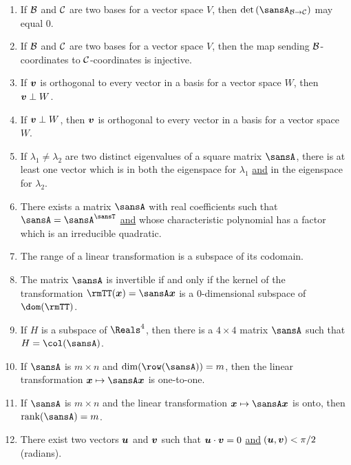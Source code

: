 \documentclass[12pt]{article}
\begin{document}
\begin{enumerate}[topsep=0.125in, itemsep=0.5in]
\begin{enumerate}[topsep=0.125in, itemsep=0.25in]
			\item If $\mathcal{B}$ and $\mathcal{C}$ are two bases for a vector space $V$, then $\det\left(\sansA_{\calB\to\calC}\right)$ may equal 0.
			
			\item If $\mathcal{B}$ and $\mathcal{C}$ are two bases for a vector space $V$, then the map sending $\mathcal{B}$-coordinates to $\mathcal{C}$-coordinates is injective.
			
			\item If $\boldsymbol{v}$ is orthogonal to every vector in a basis for a vector space $W$, then $\boldsymbol{v}\perp W$.
			
			\item If $\boldsymbol{v}\perp W$, then $\boldsymbol{v}$ is orthogonal to every vector in a basis for a vector space $W$.
			
			\item If $\lambda_1\neq\lambda_2$ are two distinct eigenvalues of a square matrix $\sansA$, there is at least one vector which is in both the eigenspace for $\lambda_1$ \ul{and} in the eigenspace for $\lambda_2$.
			
			\item There exists a matrix $\sansA$ with real coefficients such that $\sansA=\sansA^\sansT$ \ul{and} whose characteristic polynomial has a factor which is an irreducible quadratic.
			
			\item The range of a linear transformation is a subspace of its codomain.
			
			\item The matrix $\sansA$ is invertible if and only if the kernel of the transformation $\rmTT(\vect{x})=\sansA\vect{x}$ is a 0-dimensional subspace of $\dom(\rmTT)$.
			
			\item If $H$ is a subspace of $\Reals^4$, then there is a $4\times 4$ matrix $\sansA$ such that $H=\col(\sansA)$.
			
			\item If $\sansA$ is $m\times n$ and $\dim(\row(\sansA))=m$, then the linear transformation $\vect{x}\mapsto\sansA\vect{x}$ is one-to-one.
			
			\item If $\sansA$ is $m\times n$ and the linear transformation $\vect{x}\mapsto\sansA\vect{x}$ is onto, then $\rank(\sansA)=m$.
			
			\item There exist two vectors $\boldsymbol{u}$ and $\boldsymbol{v}$ such that $\boldsymbol{u}\cdot\boldsymbol{v}=0$ \ul{and} \raisebox{-0.5mm}{\large{$\measuredangle$}}$\hspace{-0.375mm}\left(\boldsymbol{u},\boldsymbol{v}\right)<\pi/2$ (radians).
		\end{enumerate}
	\end{enumerate}
\end{document}
